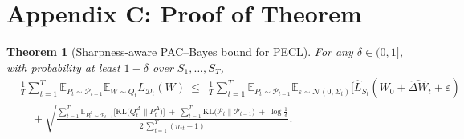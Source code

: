 \documentclass{article} %
\newtheorem{theorem}{Theorem}
\begin{document}








\section*{Appendix C: Proof of Theorem}
\begin{theorem}[Sharpness-aware PAC--Bayes bound for PECL]\label{thm:pecl-bound}
For any $\delta\in(0,1]$, with probability at least $1-\delta$ over $S_1,\ldots,S_T$,
\begin{equation}\label{eq:pecl-main}
\begin{aligned}
&\frac{1}{T}\sum_{t=1}^T
\mathbb{E}_{P_t\sim\mathcal P_{t-1}}\mathbb{E}_{W\sim Q_t}L_{\mathcal{D}_t}(W)
\ \le\
\ \frac{1}{T}\sum_{t=1}^T
\mathbb{E}_{P_t\sim\mathcal P_{t-1}}
\mathbb{E}_{\varepsilon \sim \mathcal{N}(0, \Sigma_t)}[\hat{L}_{S_t}(W_0 + \hat{\Delta W}_t + \varepsilon)
\\
&\quad +\sqrt{\frac{
\displaystyle \sum_{t=1}^T \mathbb{E}_{P_t^\Delta\sim\mathcal P_{t-1}}\!\Big[\mathrm{KL}\!\big(Q_t^\Delta\|P_t^\Delta\big)\Big]
\;+\;\displaystyle \sum_{t=1}^T \mathrm{KL}\!\big(\mathcal P_t\|\mathcal P_{t-1}\big)
\;+\;\log\!\frac{1}{\delta}
}{2\,\displaystyle\sum_{t=1}^T (m_t-1)}}.
\end{aligned}
\end{equation}
\end{theorem}
\end{document}
